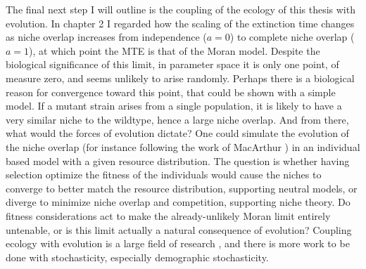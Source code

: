 The final next step I will outline is the coupling of the ecology of this thesis with evolution. 
In chapter 2 I regarded how the scaling of the extinction time changes as niche overlap increases from independence ($a=0$) to complete niche overlap ($a=1$), at which point the MTE is that of the Moran model. 
Despite the biological significance of this limit, in parameter space it is only one point, of measure zero, and seems unlikely to arise randomly. 
Perhaps there is a biological reason for convergence toward this point, that could be shown with a simple model. %
If a mutant strain arises from a single population, it is likely to have a very similar niche to the wildtype, hence a large niche overlap. 
And from there, what would the forces of evolution dictate? 
One could simulate the evolution of the niche overlap (for instance following the work of MacArthur \cite{MacArthur1957}) in an individual based model with a given resource distribution. 
The question is whether having selection optimize the fitness of the individuals would cause the niches to converge to better match the resource distribution, supporting neutral models, or diverge to minimize niche overlap and competition, supporting niche theory. 
Do fitness considerations act to make the already-unlikely Moran limit entirely untenable, or is this limit actually a natural consequence of evolution? 
Coupling ecology with evolution is a large field of research \cite{MacArthur1967,Shoener1974,Connell1980,Abrams1983,Lenski1991,Leibold1995,Peterson1997,May1999,Chesson2000,Traulsen2006,Desai2007,Xavier2007,Mayfield2010,Parsons2010,Lin2012,Jensen2014,Chotibut2015,Constable2015,Kessler2015,Castro2016,Posfai2017}, and there is more work to be done with stochasticity, especially demographic stochasticity. %

